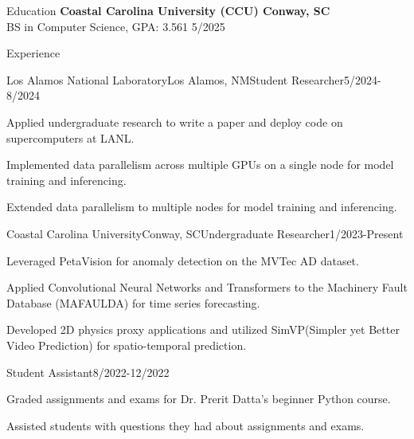 \documentclass{resume} %
\begin{document}

\begin{rSection}{Education}
  \itemsep -1pt {} 
{\bf Coastal Carolina University (CCU) \hfill Conway, SC} \\
BS in Computer Science, GPA: 3.561 \hfill 5/2025 %
\end{rSection}

\begin{rSection}{Experience}
  \itemsep -1pt {} 
\begin{rSubsection}{Los Alamos National Laboratory}{Los Alamos, NM}{Student Researcher}{5/2024-8/2024}
  \item Applied undergraduate research to write a paper and deploy code on supercomputers at LANL.
  \item Implemented data parallelism across multiple GPUs on a single node for model training and inferencing.
  \item Extended data parallelism to multiple nodes for model training and inferencing.
\end{rSubsection}

\begin{rSubsection}{Coastal Carolina University}{Conway, SC}{Undergraduate Researcher}{1/2023-Present}
  \item Leveraged PetaVision for anomaly detection on the MVTec AD dataset.
  \item Applied Convolutional Neural Networks and Transformers to the Machinery Fault Database (MAFAULDA) for time series forecasting.
  \item Developed 2D physics proxy applications and utilized SimVP(Simpler yet Better Video Prediction) for spatio-temporal prediction.
\end{rSubsection}

\begin{rSubsection}{}{}{Student Assistant}{8/2022-12/2022}
  \item Graded assignments and exams for Dr. Prerit Datta's beginner Python course.
  \item Assisted students with questions they had about assignments and exams.
\end{rSubsection}


\end{rSection}
\end{document}
